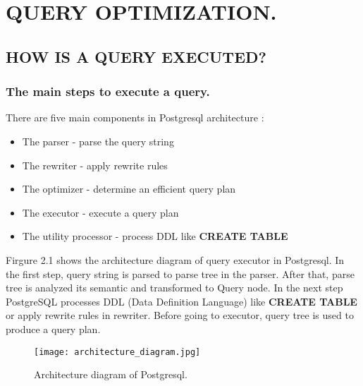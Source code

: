 
\chapter{QUERY OPTIMIZATION.}\label{chapter:query optimization}
\section{HOW IS A QUERY EXECUTED?}
\subsection{The main steps to execute a query.}
{
\begin{flushleft}
{\justify
There are five main components in Postgresql architecture \cite{PostgreSQL internals}:
\begin{itemize}
\item The parser -  parse the query string
\item The rewriter - apply rewrite rules
\item The optimizer - determine an efficient query plan
\item The executor - execute a query plan
\item The utility processor - process DDL like \bfseries CREATE TABLE
\end{itemize}
\par }
{\justify
Firgure 2.1 shows the architecture diagram of query executor in Postgresql. In the first step, query string is parsed to parse tree in the parser. After that, parse tree is analyzed its semantic and transformed to Query node. In the next step PostgreSQL processes DDL (Data Definition Language) like {\bfseries CREATE TABLE} or apply rewrite rules in rewriter. Before going to executor, query tree is used to produce a query plan.
\par }
\begin{figure}[H]
\centering
\texttt{[image: architecture\_diagram.jpg]}
\caption{Architecture diagram of Postgresql.}
\end{figure}
\end{flushleft}
}
